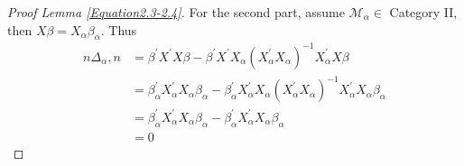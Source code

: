 \documentclass[Research_Module_ES.tex]{subfiles}
\begin{document}
\begin{proof}[Proof Lemma \ref{Equation2.3-2.4}]
	For the second part, assume $\mathcal{M}_\alpha\in$ Category II, then $X\beta=X_\alpha\beta_\alpha$. Thus
	\begin{align*}
		n\Delta_\alpha,n&=\beta^\prime X^\prime X\beta-\beta^\prime X^\prime X_\alpha \left(X_\alpha^\prime X_\alpha\right)^{-1}X_\alpha^\prime X\beta\\
		&=\beta_\alpha^\prime X_\alpha^\prime X_\alpha \beta_\alpha -\beta_\alpha^\prime X_\alpha^\prime X_\alpha\left(X_\alpha^\prime X_\alpha\right)^{-1} X_\alpha^\prime X_\alpha\beta_\alpha\\
		&=\beta_\alpha^\prime X_\alpha^\prime X_\alpha \beta_\alpha - \beta_\alpha^\prime X_\alpha^\prime X_\alpha \beta_\alpha\\
		&=0
	\end{align*}
	
\end{proof}
\end{document}
